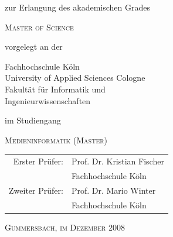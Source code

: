 \begin{titlepage}
\begin{center}
zur Erlangung des akademischen Grades\\
\begin{large}
\textsc{Master of Science}\\ 
\end{large}

\vspace{0.4cm}

vorgelegt an der\\ 
\begin{large}
\begin{scshape}
Fachhochschule Köln\\
University of Applied Sciences Cologne\\
Fakultät für Informatik und\\
Ingenieurwissenschaften\\
\end{scshape}
\end{large}

\vspace{0.4cm}

\vspace{0.2cm}
im Studiengang\\ 
\begin{large}
\textsc{Medieninformatik (Master)}
\end{large}

\vspace{0.7cm}

\begin{tabular}{rl}
        Erster Prüfer:  &  Prof. Dr. Kristian Fischer\\
       							    &  \small Fachhochschule Köln \\[1.0em]
       Zweiter Prüfer:  &  Prof. Dr. Mario Winter\\
       							    &  \small Fachhochschule Köln \\
\end{tabular}

\vspace{0.5cm}

\textsc{Gummersbach, im Dezember 2008}

\end{center}


\end{titlepage}
